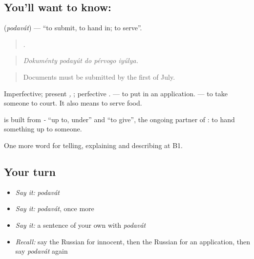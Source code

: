 \subsection*{You'll want to know: }
\textbf{} (\emph{podavát}) — \textquotedblleft{}to submit, to hand in; to serve\textquotedblright{}.

\begin{quote}
    .
\end{quote}

\begin{quote}
\emph{Dokuménty podayút do pérvogo iyúlya.}
\end{quote}

\begin{quote}
Documents must be submitted by the first of July.
\end{quote}

Imperfective; present \emph{, }; perfective \emph{}. \emph{ } — to put in an application. \emph{  } — to take someone to court. It also means to serve food.

\begin{cousinweb}
\textbf{} is built from \emph{-} \textquotedblleft{}up to, under\textquotedblright{} and \emph{} \textquotedblleft{}to give\textquotedblright{}, the ongoing partner of \emph{}: to hand something up to someone.
\end{cousinweb}

\begin{grammarlens}[title={What you've built}]
One more word for telling, explaining and describing at B1.
\end{grammarlens}

\subsection*{Your turn}
\begin{itemize}
\raggedright
  \item \emph{Say it:} \emph{podavát}
  \item \emph{Say it:} \emph{podavát}, once more
  \item \emph{Say it:} a sentence of your own with \emph{podavát}
  \item \emph{Recall:} say the Russian for innocent, then the Russian for an application, then say \emph{podavát} again
\end{itemize}

